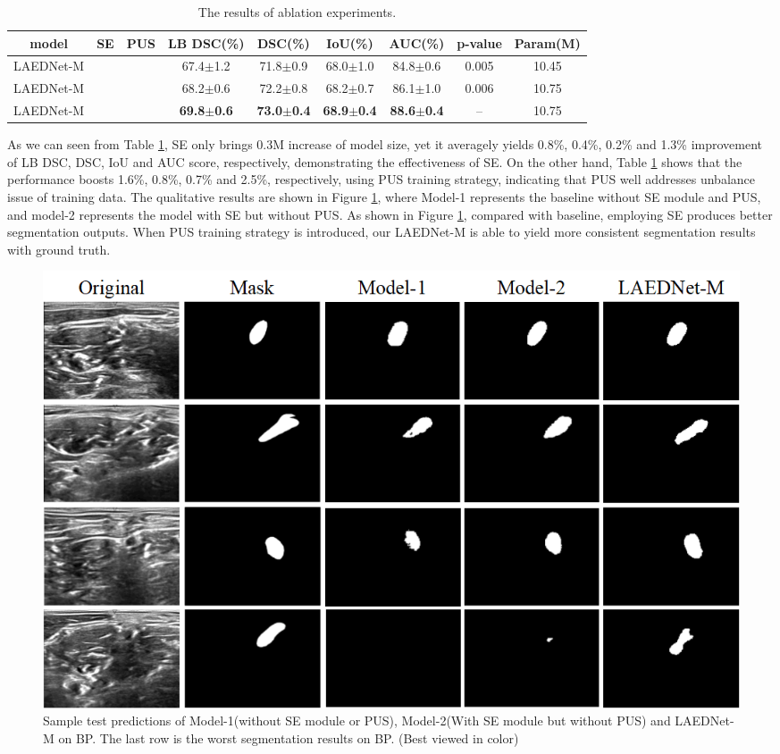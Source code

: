 \documentclass[review]{elsarticle}
\begin{document}
\begin{table}[!t]
	\caption{The results of ablation experiments.}
	\centering
	\setlength{\tabcolsep}{1.5mm}
	\begin{tabular} {c|cc|cccc|c|c}
		\hline
		model & SE & PUS & LB DSC(\%) & DSC(\%) & IoU(\%) & AUC(\%) & p-value & Param(M) \\
		\hline
		LAEDNet-M & & & 67.4$\pm$1.2 & 71.8$\pm$0.9 & 68.0$\pm$1.0 & 84.8$\pm$0.6 & 0.005 & 10.45\\
		\hline
		LAEDNet-M & \checkmark & & 68.2$\pm$0.6 & 72.2$\pm$0.8 & 68.2$\pm$0.7 & 86.1$\pm$1.0 & 0.006 & 10.75\\
		\hline
		LAEDNet-M &	\checkmark & \checkmark & \textbf{69.8$\pm$0.6} & \textbf{73.0$\pm$0.4} & \textbf{68.9$\pm$0.4} & \textbf{88.6$\pm$0.4} & -- & 10.75\\
		\hline
	\end{tabular}
	\label{ablation}
\end{table}

As we can seen from Table \ref{ablation}, SE only brings 0.3M increase of model size, yet it averagely yields 0.8\%, 0.4\%, 0.2\% and 1.3\% improvement of LB DSC, DSC, IoU and AUC score, respectively, demonstrating the effectiveness of SE. On the other hand, Table \ref{ablation} shows that the performance boosts 1.6\%, 0.8\%, 0.7\% and 2.5\%, respectively, using PUS training strategy, indicating that PUS well addresses unbalance issue of training data. The qualitative results are shown in Figure \ref{fig8}, where Model-1 represents the baseline without SE module and PUS, and model-2 represents the model with SE but without PUS. As shown in Figure \ref{fig8}, compared with baseline, employing SE produces better segmentation outputs. When PUS training strategy is introduced, our LAEDNet-M is able to yield more consistent segmentation results with ground truth.

\begin{figure}[!t]
	\includegraphics[width=\textwidth]{results-ablation1.png}
	\caption{Sample test predictions of Model-1(without SE module or PUS), Model-2(With SE module but without PUS) and LAEDNet-M on BP\cite{Kaggle}. The last row is the worst segmentation results on BP\cite{Kaggle}. (Best viewed in color)}
	\label{fig8}
\end{figure}
\end{document}
